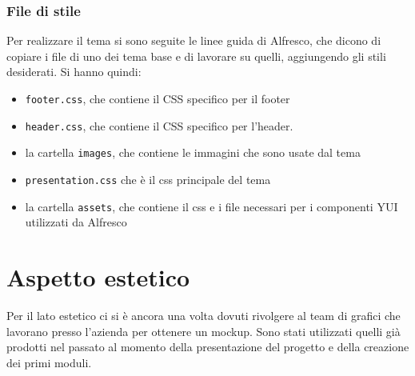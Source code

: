 \subsubsection{File di stile}
Per realizzare il tema si sono seguite le linee guida di Alfresco, che dicono di copiare i file di uno dei tema base e di lavorare su quelli, aggiungendo gli stili desiderati. Si hanno quindi:
\begin{itemize}
\item \texttt{footer.css}, che contiene il CSS specifico per il footer
\item \texttt{header.css}, che contiene il CSS specifico per l'header.
\item la cartella \texttt{images}, che contiene le immagini che sono usate dal tema
\item \texttt{presentation.css} che è il css principale del tema
\item la cartella \texttt{assets}, che contiene il css e i file necessari per i componenti \gls{YUI} utilizzati da Alfresco
\end{itemize}
\section{Aspetto estetico}
Per il lato estetico ci si è ancora una volta dovuti rivolgere al team di grafici che lavorano presso l'azienda per ottenere un mockup. Sono stati utilizzati quelli già prodotti nel passato al momento della presentazione del progetto e della creazione dei primi moduli.
